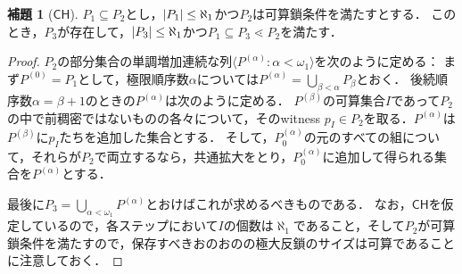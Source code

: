 \documentclass[uplatex]{jsarticle}
\newcommand{\CH}{\mathsf{CH}}
\newcommand{\seq}[1]{{\langle#1\rangle}}
\DeclarePairedDelimiter\abs{\lvert}{\rvert}
\renewcommand\subset{\subseteq}
\theoremstyle{definition}
\newtheorem{lem}[thm]{補題}
\begin{document}
	\begin{lem}[$\CH$]\label{lem:p1p2p3}
		$P_1 \subset P_2$とし，$\abs{P_1} \le \aleph_1$かつ$P_2$は可算鎖条件を満たすとする．
		このとき，$P_3$が存在して，$\abs{P_3} \le \aleph_1$かつ$P_1 \subset P_3 \lessdot P_2$を満たす．
	\end{lem}
	\begin{proof}
		$P_2$の部分集合の単調増加連続な列$\seq{P^{(\alpha)} : \alpha < \omega_1}$を次のように定める：
		まず$P^{(0)} = P_1$として，極限順序数$\alpha$については$P^{(\alpha)} = \bigcup_{\beta < \alpha} P_\beta$とおく．
		後続順序数$\alpha = \beta + 1$のときの$P^{(\alpha)}$は次のように定める．
		$P^{(\beta)}$の可算集合$I$であって$P_2$の中で前稠密ではないものの各々について，そのwitness $p_I \in P_2$を取る．$P^{(\alpha)}$は$P^{(\beta)}$に$p_I$たちを追加した集合とする．
		そして，$P^{(\alpha)}_0$の元のすべての組について，それらが$P_2$で両立するなら，共通拡大をとり，$P^{(\alpha)}_0$に追加して得られる集合を$P^{(\alpha)}$とする．
		
		最後に$P_3 = \bigcup_{\alpha < \omega_1} P^{(\alpha)}$とおけばこれが求めるべきものである．
		なお，$\CH$を仮定しているので，各ステップにおいて$I$の個数は$\aleph_1$であること，そして$P_2$が可算鎖条件を満たすので，保存すべきおのおのの極大反鎖のサイズは可算であることに注意しておく．
	\end{proof}
\end{document}
